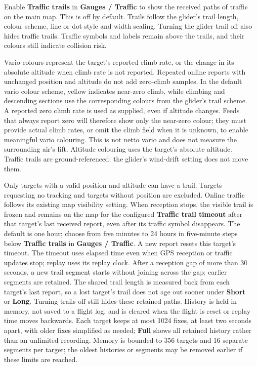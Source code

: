 Enable {\bf Traffic trails} in {\bf Gauges / Traffic} to show the
received paths of traffic on the main map.  This is off by default.
Trails follow the glider's trail length, colour scheme, line or dot
style and width scaling.  Turning the glider trail off also hides
traffic trails.  Traffic symbols and labels remain above the trails,
and their colours still indicate collision risk.

Vario colours represent the target's reported climb rate, or the
change in its absolute altitude when climb rate is not reported.
Repeated online reports with unchanged position and altitude do not
add zero-climb samples.  In the default vario colour scheme, yellow
indicates near-zero climb, while climbing and descending sections
use the corresponding colours from the glider's trail scheme.
A reported zero climb rate is used as supplied, even if altitude changes.
Feeds that always report zero will therefore show only the near-zero
colour; they must provide actual climb rates, or omit the climb field
when it is unknown, to enable meaningful vario colouring.
This is not netto vario and does not measure the surrounding air's lift.
Altitude colouring uses the target's absolute altitude.
Traffic trails are ground-referenced: the glider's wind-drift setting
does not move them.

Only targets with a valid position and altitude can have a trail.
Targets requesting no tracking and targets without position are
excluded.  Online traffic follows its existing map visibility setting.
When reception stops, the visible trail is frozen and remains on the map
for the configured {\bf Traffic trail timeout} after that target's last
received report, even after its traffic symbol disappears.  The default
is one hour; choose from five minutes to 24 hours in five-minute steps
below {\bf Traffic trails} in {\bf Gauges / Traffic}.
A new report resets this target's timeout.
The timeout uses elapsed time even when GPS reception or traffic
updates stop; replay uses its replay clock.
After a reception gap of more than 30 seconds, a new trail segment starts
without joining across the gap; earlier segments are retained.
The shared trail length is measured back from each target's last report,
so a lost target's trail does not age out sooner under {\bf Short} or
{\bf Long}.  Turning trails off still hides these retained paths.
History is held in memory, not saved to a flight log, and is cleared
when the flight is reset or replay time moves backwards.  Each target
keeps at most 1024 fixes, at least two seconds apart, with older fixes
simplified as needed; {\bf Full} shows all retained history rather than
an unlimited recording.  Memory is bounded to 356 targets and 16 separate
segments per target; the oldest histories or segments may be removed
earlier if these limits are reached.


